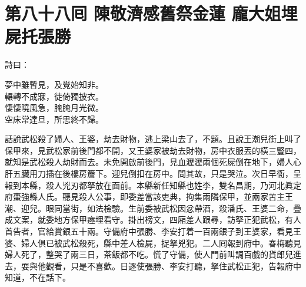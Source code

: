 
\chapter*{第八十八囘 陳敬濟感舊祭金蓮 龐大姐埋屍托張勝}


詩曰：

\begin{myquote}
夢中雖暫見，及覺始知非。\\輾轉不成寐，徒倚獨披衣。\\悽悽曉風急，腌腌月光微。\\空床常達旦，所思終不歸。
\end{myquote}

話說武松殺了婦人、王婆，劫去財物，逃上梁山去了，不題。且說王潮兒街上叫了保甲來，見武松家前後門都不開，又王婆家被劫去財物，房中衣服丟的橫三豎四，就知是武松殺人劫財而去。未免開啟前後門，見血瀝瀝兩個死屍倒在地下，婦人心肝五臟用刀插在後樓房簷下。迎兒倒扣在房中。問其故，只是哭泣。{}次日早衙，呈報到本縣，殺人兇刃都拏放在面前。本縣新任知縣也姓李，雙名昌期，乃河北眞定府棗強縣人氏。聽見殺人公事，即委差當該吏典，拘集兩隣保甲，並兩家苦主王潮、迎兒。眼同當街，如法檢驗。生前委被武松因忿帶酒，殺潘氏、王婆二命，疊成文案，就委地方保甲瘞埋看守。掛出榜文，四廂差人跟尋，訪拏正犯武松，有人首告者，官給賞銀五十兩。守備府中張勝、李安打着一百兩銀子到王婆家，看見王婆、婦人俱已被武松殺死，縣中差人檢屍，捉拏兇犯。二人囘報到府中。春梅聽見婦人死了，整哭了兩三日，茶飯都不吃。慌了守備，使人門前叫調百戲的貨郎兒進去，耍與他觀看，只是不喜歡。日逐使張勝、李安打聽，拏住武松正犯，告報府中知道，不在話下。

